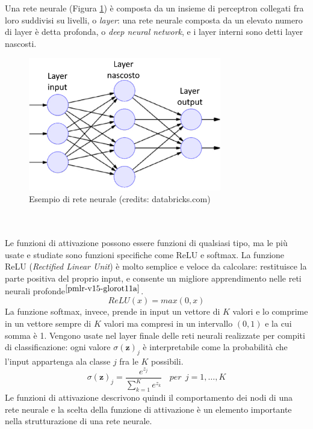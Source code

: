 Una rete neurale (Figura \ref{fig:reteneurale}) è composta da un insieme di perceptron collegati fra loro suddivisi su livelli, o \textit{layer}: una rete neurale composta da un elevato numero di layer è detta profonda, o \textit{deep neural network}, e i layer interni sono detti layer nascosti.
\begin{figure}[b]
	\begin{center}
		\includegraphics[width=0.75\textwidth]{img/reteneurale.jpg}
		\caption{Esempio di rete neurale (credits: databricks.com)}
		\label{fig:reteneurale}
	\end{center}
\end{figure}
\\\\
Le funzioni di attivazione possono essere funzioni di qualsiasi tipo, ma le più usate e studiate sono funzioni specifiche come ReLU e softmax. La funzione ReLU (\textit{Rectified Linear Unit}) è molto semplice e veloce da calcolare: restituisce la parte positiva del proprio input, e consente un migliore apprendimento nelle reti neurali profonde$^{\cite{pmlr-v15-glorot11a}}$.
\begin{equation}\label{eq:fun_relu}
ReLU(x) = max(0, x)
\end{equation}
La funzione softmax, invece, prende in input un vettore di $K$ valori e lo comprime in un vettore sempre di $K$ valori ma compresi in un intervallo $(0, 1)$ e la cui somma è 1. Vengono usate nel layer finale delle reti neurali realizzate per compiti di classificazione: ogni valore $\sigma(\textbf{z})_j$  è interpretabile come la probabilità che l'input appartenga ala classe $j$ fra le $K$ possibili.
\begin{equation}\label{eq:fun_softmax}
\sigma(\textbf{z})_j = \frac{e^{z_j}}{\sum_{k=1}^K e^{z_k}}\:\:\:\:per\:\:j = 1,\ldots,K
\end{equation}
Le funzioni di attivazione descrivono quindi il comportamento dei nodi di una rete neurale e la scelta della funzione di attivazione è un elemento importante nella strutturazione di una rete neurale.
